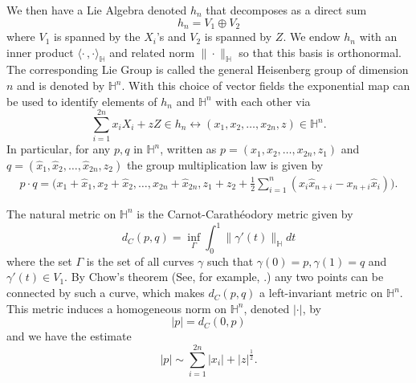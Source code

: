 \documentclass[12pt]{amsart}
\theoremstyle{plain}
\theoremstyle{definition}
\numberwithin{equation}{section}
\begin{document}
We then have a Lie Algebra denoted $h_n$ that decomposes as a direct sum 
\begin{equation*}
h_n = V_1 \oplus V_2 
\end{equation*}
where $V_1$ is
spanned by the $X_i$'s and $V_2$ is spanned by $Z$. 
We endow $h_n$  with an inner
product ${\langle {\cdot \,},{\cdot} \rangle_\mathbb{H}}$ and related norm $\|\cdot\|_{\mathbb{H}}$ so that this basis is
orthonormal. 
The corresponding Lie Group is called the
general Heisenberg group of dimension $n$ and is denoted by $\mathbb{H}^n$. With this choice of vector fields the exponential map can be used to identify elements of $h_n$ and $\mathbb{H}^n$ with each other via
$$\sum_{i=1}^{2n}x_iX_i+ zZ \in h_n \leftrightarrow(x_1, x_2, \ldots, x_{2n},z)\in \mathbb{H}^n.$$
In particular,  for any $p,q$ in $\mathbb{H}^n$, written as 
$p=(x_1, x_2, \ldots, x_{2n},z_1)$ 
and $q=(\hat{x}_1, \hat{x}_2, \ldots, \hat{x}_{2n},z_2)$ the group multiplication law is given by 
\begin{eqnarray*}
p \cdot q = \mathbf{(} x_1+\hat{x}_1, x_2+\hat{x}_2, \ldots, x_{2n}+\hat{x}_{2n}, z_{1}+z_{2} + \frac{1}{2}\sum_{i=1}^{n}
(x_i\hat{x}_{n+i}-x_{n+i}\hat{x}_i) \mathbf{)}.
\end{eqnarray*}

The natural metric on $\mathbb{H}^n$ is the Carnot-Carath\'{e}odory metric  given by 
$$d_C(p,q)= \inf_{\Gamma} \int_{0}^{1} \| \gamma '(t) \|_{\mathbb{H}} dt $$
where the set $ \Gamma $
is the set of all curves $ \gamma $ such that $\gamma (0) = p, \gamma (1) = q$ and $\gamma'(t) \in V_1$.  By Chow's theorem (See, for example,
\cite{BR:SRG}.) any two points
 can be connected by such a curve, which
makes $d_C(p,q)$ a left-invariant metric on $\mathbb{H}^n$.
This metric induces a
homogeneous norm on $\mathbb{H}^n$, denoted $|\cdot|$, by $$|p|=d_C(0,p)$$ and we have the estimate $$|p| \sim \sum_{i=1}^{2n}|x_i|+|z|^{\frac{1}{2}}.$$
\end{document}
